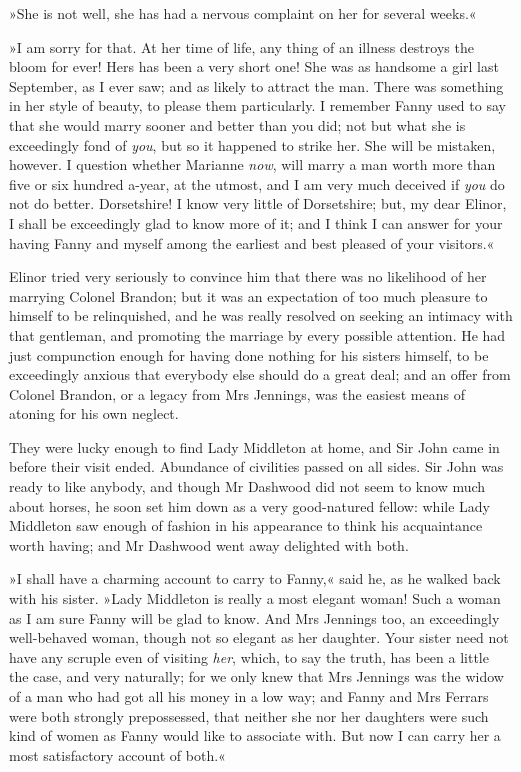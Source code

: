 »She is not well, she has had a nervous complaint on her for several weeks.«

»I am sorry for that. At her time of life, any thing of an illness destroys the bloom for ever! Hers has been a very short one! She was as handsome a girl last September, as I ever saw; and as likely to attract the man. There was something in her style of beauty, to please them particularly. I remember Fanny used to say that she would marry sooner and better than you did; not but what she is exceedingly fond of \textit{you}, but so it happened to strike her. She will be mistaken, however. I question whether Marianne \textit{now}, will marry a man worth more than five or six hundred a-year, at the utmost, and I am very much deceived if \textit{you} do not do better. Dorsetshire! I know very little of Dorsetshire; but, my dear Elinor, I shall be exceedingly glad to know more of it; and I think I can answer for your having Fanny and myself among the earliest and best pleased of your visitors.«

Elinor tried very seriously to convince him that there was no likelihood of her marrying Colonel Brandon; but it was an expectation of too much pleasure to himself to be relinquished, and he was really resolved on seeking an intimacy with that gentleman, and promoting the marriage by every possible attention. He had just compunction enough for having done nothing for his sisters himself, to be exceedingly anxious that everybody else should do a great deal; and an offer from Colonel Brandon, or a legacy from Mrs Jennings, was the easiest means of atoning for his own neglect.

They were lucky enough to find Lady Middleton at home, and Sir John came in before their visit ended. Abundance of civilities passed on all sides. Sir John was ready to like anybody, and though Mr Dashwood did not seem to know much about horses, he soon set him down as a very good-natured fellow: while Lady Middleton saw enough of fashion in his appearance to think his acquaintance worth having; and Mr Dashwood went away delighted with both.

»I shall have a charming account to carry to Fanny,« said he, as he walked back with his sister. »Lady Middleton is really a most elegant woman! Such a woman as I am sure Fanny will be glad to know. And Mrs Jennings too, an exceedingly well-behaved woman, though not so elegant as her daughter. Your sister need not have any scruple even of visiting \textit{her}, which, to say the truth, has been a little the case, and very naturally; for we only knew that Mrs Jennings was the widow of a man who had got all his money in a low way; and Fanny and Mrs Ferrars were both strongly prepossessed, that neither she nor her daughters were such kind of women as Fanny would like to associate with. But now I can carry her a most satisfactory account of both.«